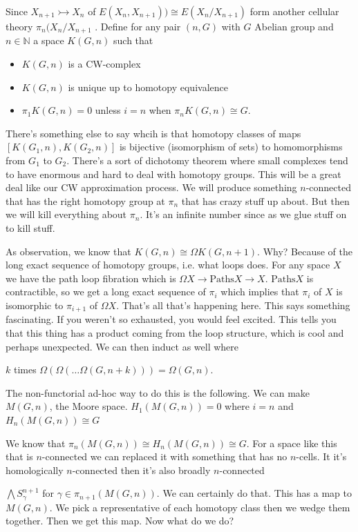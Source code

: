 \documentclass[12pt]{article}
\theoremstyle{definition}
\begin{document}
Since $X_{n+1}\rightarrowtail X_n$ of $E(X_n,X_{n+1}))\cong E(X_n/X_{n+1})$ form another cellular theory $\pi_n(X_n/X_{n+1}$ . Define for any pair $(n,G)$ with $G$ Abelian group and $n\in \mathbb{N}$ a space $K(G,n)$ such that \begin{itemize}
	\item $K(G,n)$ is a CW-complex
	\item $K(G,n)$ is unique up to homotopy equivalence
	\item $\pi_1K(G,n)=0$ unless $i=n$ when $\pi_n K(G,n)\cong G$. 
\end{itemize}
There's something else to say whcih is that homotopy classes of maps $[K(G_1,n),K(G_2,n)]$ is bijective (isomorphism of sets) to homomorphisms from $G_1$ to $G_2$. There's a sort of dichotomy theorem where small complexes tend to have enormous and hard to deal with homotopy groups. This will be a great deal like our CW approximation process. We will produce something $n$-connected that has the right homotopy group at $\pi_n$ that has crazy stuff up about. But then we will kill everything about $\pi_n$. It's an infinite number since as we glue stuff on to kill stuff.

As observation, we know that $K(G,n)\cong \Omega K(G,n+1)$. Why? Because of the long exact sequence of homotopy groups, i.e. what loops does. For any space $X$ we have the path loop fibration which is $\Omega X\to \text{Paths} X\to X$. $\text{Paths} X$ is contractible, so we get a long exact sequence of $\pi_i$ which implies that $\pi_i$ of $X$ is isomorphic to $\pi_{i+1}$ of $\Omega X$. That's all that's happening here. This says something fascinating. If you weren't so exhausted, you would feel excited. This tells you that this thing has a product coming from the loop structure, which is cool and perhaps unexpected. 
We can then induct as well where

$k$ times $\Omega(\Omega(\dots \Omega(G,n+k)))=\Omega(G,n)$. 

The non-functorial ad-hoc way to do this is the following. We can make $M(G,n)$, the Moore space. $H_1(M(G,n))=0$ where $i=n$ and $H_n(M(G,n))\cong G$

We know that $\pi_n(M(G,n))\cong H_n(M(G,n))\cong G$. For a space like this that is $n$-connected we can replaced it with something that has no $n$-cells. It it's homologically $n$-connected then it's also broadly $n$-connected

$\bigwedge S_\gamma^{n+1}$ for $\gamma\in \pi_{n+1}(M(G,n))$. We can certainly do that. This has a map to $M(G,n)$. We pick a representative of each homotopy class then we wedge them together. Then we get this map. Now what do we do? 
\end{document}
